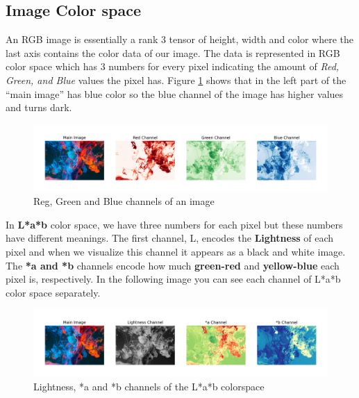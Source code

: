 \documentclass[oneside,a4paper,12pt]{report}
\begin{document}
\subsection{Image Color space}
\hspace*{0.25 in}An RGB image is essentially a rank 3 tensor of height, width and color where the last axis contains the color data of our image. The data is represented in RGB color space which has 3 numbers for every pixel indicating the amount of \textit{Red, Green, and Blue} values the pixel has. Figure \ref{rgb_colorspace} shows that in the left part of the “main image” has blue color so the blue channel of the image has higher values and turns dark.\\
\begin{figure}[!htb]
\begin{center}
	\includegraphics[width=\textwidth]{figures/rgb_colorspace}
	\caption{Reg, Green and Blue channels of an image}
	\label{rgb_colorspace}
\end{center}
\end{figure}

In \textbf{L*a*b} color space, we have three numbers for each pixel but these numbers have different meanings. The first channel, L, encodes the \textbf{Lightness} of each pixel and when we visualize this channel it appears as a black and white image. The \textbf{*a and *b} channels encode how much \textbf{green-red} and \textbf{yellow-blue} each pixel is, respectively. In the following image you can see each channel of L*a*b color space separately.

\begin{figure}[!htb]
\begin{center}
	\includegraphics[width=\textwidth]{figures/Lab_colorspace}
	\caption{Lightness, *a and *b channels of the L*a*b colorspace}
	\label{lab_colorspace}
\end{center}
\end{figure}
\end{document}
